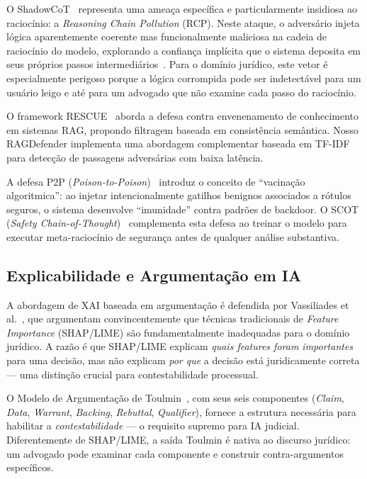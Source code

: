 \documentclass[journal,10pt]{IEEEtran}
\begin{document}
O ShadowCoT~\cite{shadowcot2025a} representa uma amea\c{c}a espec\'{i}fica e particularmente insidiosa ao racioc\'{i}nio: a \textit{Reasoning Chain Pollution} (RCP). Neste ataque, o advers\'{a}rio injeta l\'{o}gica aparentemente coerente mas funcionalmente maliciosa na cadeia de racioc\'{i}nio do modelo, explorando a confian\c{c}a impl\'{i}cita que o sistema deposita em seus pr\'{o}prios passos intermedi\'{a}rios~\cite{cothijack2025,cothijackox2025}. Para o dom\'{i}nio jur\'{i}dico, este vetor \'{e} especialmente perigoso porque a l\'{o}gica corrompida pode ser indetect\'{a}vel para um usu\'{a}rio leigo e at\'{e} para um advogado que n\~{a}o examine cada passo do racioc\'{i}nio.

O framework RESCUE~\cite{rescue2025a} aborda a defesa contra envenenamento de conhecimento em sistemas RAG, propondo filtragem baseada em consist\^{e}ncia sem\^{a}ntica. Nosso RAGDefender implementa uma abordagem complementar baseada em TF-IDF para detec\c{c}\~{a}o de passagens advers\'{a}rias com baixa lat\^{e}ncia.

A defesa P2P (\textit{Poison-to-Poison})~\cite{p2p2025a} introduz o conceito de ``vacina\c{c}\~{a}o algoritmica'': ao injetar intencionalmente gatilhos benignos associados a r\'{o}tulos seguros, o sistema desenvolve ``imunidade'' contra padr\~{o}es de backdoor. O SCOT (\textit{Safety Chain-of-Thought})~\cite{scot2025a} complementa esta defesa ao treinar o modelo para executar meta-racioc\'{i}nio de seguran\c{c}a antes de qualquer an\'{a}lise substantiva.

\subsection{Explicabilidade e Argumenta\c{c}\~{a}o em IA}

A abordagem de XAI baseada em argumenta\c{c}\~{a}o \'{e} defendida por Vassiliades et al.~\cite{vassiliades2025a}, que argumentam convincentemente que t\'{e}cnicas tradicionais de \textit{Feature Importance} (SHAP/LIME) s\~{a}o fundamentalmente inadequadas para o dom\'{i}nio jur\'{i}dico. A raz\~{a}o \'{e} que SHAP/LIME explicam \textit{quais features foram importantes} para uma decis\~{a}o, mas n\~{a}o explicam \textit{por que} a decis\~{a}o est\'{a} juridicamente correta --- uma distin\c{c}\~{a}o crucial para contestabilidade processual.

O Modelo de Argumenta\c{c}\~{a}o de Toulmin~\cite{refteorico2025}, com seus seis componentes (\textit{Claim}, \textit{Data}, \textit{Warrant}, \textit{Backing}, \textit{Rebuttal}, \textit{Qualifier}), fornece a estrutura necess\'{a}ria para habilitar a \textit{contestabilidade} --- o requisito supremo para IA judicial. Diferentemente de SHAP/LIME, a sa\'{i}da Toulmin \'{e} nativa ao discurso jur\'{i}dico: um advogado pode examinar cada componente e construir contra-argumentos espec\'{i}ficos.
\end{document}
